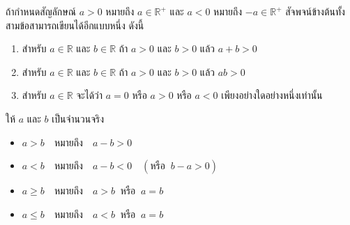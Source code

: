 \vspace{0.5em}
ถ้ากำหนดสัญลักษณ์ $a > 0$ หมายถึง $a \in \mathbb{R}^{+}$ และ $a < 0$ หมายถึง $-a \in \mathbb{R}^{+}$ สัจพจน์ข้างต้นทั้งสามข้อสามารถเขียนได้อีกแบบหนึ่ง ดังนี้
\begin{enumerate}[label=\arabic*., leftmargin=2em, itemsep=0.5em]
	\item สำหรับ $a \in \mathbb{R}$ และ $b \in \mathbb{R}$ ถ้า $a > 0$ และ $b > 0$ แล้ว $a+b > 0$
	\item สำหรับ $a \in \mathbb{R}$ และ $b \in \mathbb{R}$ ถ้า $a > 0$ และ $b > 0$ แล้ว $ab > 0$
	\item สำหรับ $a \in \mathbb{R}$ จะได้ว่า $a = 0$ หรือ $a > 0$ หรือ $a < 0$ เพียงอย่างใดอย่างหนึ่งเท่านั้น
\end{enumerate}

\begin{definitionbox}
	ให้ $a$ และ $b$ เป็นจำนวนจริง
	\begin{itemize}
		\item $a > b \quad \text{หมายถึง} \quad a - b > 0$
		\item $a < b \quad \text{หมายถึง} \quad a - b < 0 \quad (\text{หรือ} \;\; b - a > 0)$
		\item $a \geq b \quad \text{หมายถึง} \quad a > b \;\; \text{หรือ} \;\; a = b$
		\item $a \leq b \quad \text{หมายถึง} \quad a < b \;\; \text{หรือ} \;\; a = b$
	\end{itemize}
\end{definitionbox}

